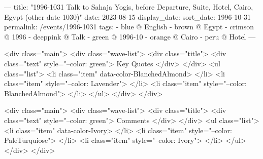 ---
title: "1996-1031 Talk to Sahaja Yogis, before Departure, Suite, Hotel, Cairo, Egypt (other date 1030)"
date: 2023-08-15
display_date: 
sort_date: 1996-10-31
permalink: /events/1996-1031
tags:
  - blue @ English
  - brown @ Egypt
  - crimson @ 1996
  - deeppink @ Talk
  - green @ 1996-10
  - orange @ Cairo
  - peru @ Hotel
---

<div class="main">
  <div class="wave-list">
    <div class="title">
      <div class="text" style="--color: green">
        Key Quotes
      </div>
    </div>
    <ul class="list">
        <li class="item" data-color-BlanchedAlmond>
        </li>
        <li class="item" style="--color: Lavender">
        </li>
        <li class="item" style="--color: BlanchedAlmond">
        </li>
      </ul>
  </div>
</div>

<div class="main">
  <div class="wave-list">
    <div class="title">
      <div class="text" style="--color: green">
        Comments
      </div>
    </div>
    <ul class="list">
        <li class="item" data-color-Ivory>
        </li>
        <li class="item" style="--color: PaleTurquiose">
        </li>
        <li class="item" style="--color: Ivory">
        </li>
      </ul>
  </div>
</div>